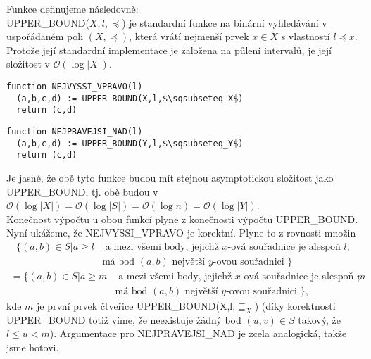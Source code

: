\documentclass[12pt,a4paper]{article}
\theoremstyle{plain}
\begin{document}
Funkce definujeme následovně:\\

UPPER\_BOUND($X,l,\preceq$) je standardní funkce na binární vyhledávání v uspořádaném poli $(X,\preceq)$, která vrátí nejmenší prvek $x\in X$ s vlastností $l\preceq x$. Protože její standardní implementace je založena na půlení intervalů, je její složitost v $\mathcal{O}(\log |X|)$.

\begin{lstlisting}[mathescape]
function NEJVYSSI_VPRAVO(l)
  (a,b,c,d) := UPPER_BOUND(X,l,$\sqsubseteq_X$) 
  return (c,d)
\end{lstlisting}

\begin{lstlisting}[mathescape]
function NEJPRAVEJSI_NAD(l)
  (a,b,c,d) := UPPER_BOUND(Y,l,$\sqsubseteq_Y$) 
  return (c,d)
\end{lstlisting}

Je jasné, že obě tyto funkce budou mít stejnou asymptotickou složitost jako UPPER\_BOUND, tj. obě budou v $\mathcal{O}(\log |X|)=\mathcal{O}(\log |S|)=\mathcal{O}(\log n)=\mathcal{O}(\log |Y|)$.\\

Konečnost výpočtu u obou funkcí plyne z konečnosti výpočtu UPPER\_BOUND. Nyní ukážeme, že NEJVYSSI\_VPRAVO je korektní. Plyne to z rovnosti množin
\begin{equation*}
\begin{split}
\{(a,b)\in S | a\geq l &\text{ a mezi všemi body,
jejichž $x$-ová souřadnice je alespoň $l$},\\ 
&\text{má bod $(a,b)$ největší $y$-ovou souřadnici }\}
\end{split}
\end{equation*}
\begin{equation*}
\begin{split}
=\{(a,b)\in S | a\geq m &\text{ a mezi všemi body,
jejichž $x$-ová souřadnice je alespoň $m$},\\
 &\text{má bod $(a,b)$ největší $y$-ovou souřadnici }\},
\end{split}
\end{equation*}
kde $m$ je první prvek čtveřice UPPER\_BOUND(X,l,$\sqsubseteq_X$) (díky korektnosti UPPER\_BOUND totiž víme, že neexistuje žádný bod $(u,v)\in S$ takový, že $l\leq u<m$). Argumentace pro NEJPRAVEJSI\_NAD je zcela analogická, takže jsme hotovi.
\end{document}
